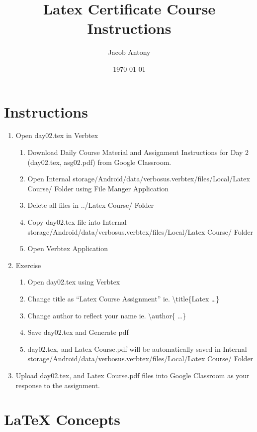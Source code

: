 \documentclass{article}
\title{Latex Certificate Course Instructions}
\author{Jacob Antony}
\date{\today}
\begin{document}
\maketitle

\section*{Instructions}

\begin{enumerate}
	\item Open day02.tex in Verbtex
	\begin{enumerate}
		\item Download Daily Course Material and Assignment Instructions for Day 2 (day02.tex, asg02.pdf) from Google Classroom.
		\item Open Internal storage/Android/data/verbosus.verbtex/files/Local/Latex Course/ Folder using File Manger Application
		\item Delete all files in ../Latex Course/ Folder
		\item Copy day02.tex file into Internal storage/Android/data/verbosus.verbtex/files/Local/Latex Course/  Folder
		\item Open Verbtex Application
	\end{enumerate}
	\item Exercise
	\begin{enumerate}
		\item Open day02.tex using Verbtex
		\item Change title as ``Latex Course Assignment'' ie. \textbackslash{}title\{Latex \dots \}
		\item Change author to reflect your name ie. \textbackslash{}author\{ \dots \}
		\item Save day02.tex and Generate pdf
		\item day02.tex, and Latex Course.pdf will be automatically saved in Internal storage/Android/data/verbosus.verbtex/files/Local/Latex Course/  Folder
	\end{enumerate}
	\item Upload day02.tex, and Latex Course.pdf files into Google Classroom as your response to the assignment.
\end{enumerate}

\section{\LaTeX{} Concepts}
\end{document}
